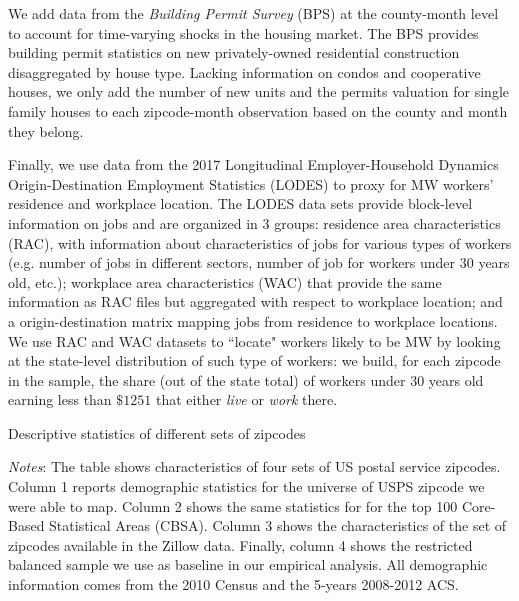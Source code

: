 We add data from the \textit{Building Permit Survey} (BPS) at the county-month level to account for 
time-varying shocks in the housing market. The BPS provides building permit statistics on new 
privately-owned residential construction disaggregated by house type. Lacking information on condos 
and cooperative houses, we only add the number of new units and the permits valuation for single 
family houses to each zipcode-month observation based on the county and month they belong. 

Finally, we use data from the 2017 Longitudinal Employer-Household Dynamics Origin-Destination 
Employment Statistics (LODES) to proxy for MW workers' residence and workplace location. The LODES 
data sets provide block-level information on jobs and are organized in 3 groups: residence area 
characteristics (RAC), with information about characteristics of jobs for various types of workers 
(e.g. number of jobs in different sectors, number of job for workers under 30 years old, etc.); 
workplace area characteristics (WAC) that provide the same information as RAC files but aggregated 
with respect to workplace location; and a origin-destination matrix mapping jobs from residence to 
workplace locations. We use RAC and WAC datasets to ``locate" workers likely to be MW by looking at 
the state-level distribution of such type of workers: we build, for each zipcode in the sample, the 
share (out of the state total) of workers under 30 years old earning less than $\$1251$ that either 
\textit{live} or \textit{work} there. 


\begin{table}[h!]
	\caption{Descriptive statistics of different sets of zipcodes}
	\centering
	\label{tab:desc_stats}    
	
	\begin{minipage}{0.95\textwidth} \footnotesize
		\vspace{3mm} 
		\textit{Notes}: The table shows characteristics of four sets of US postal service zipcodes.
		Column 1 reports demographic statistics for the universe of USPS zipcode we were able to 
		map. Column 2 shows the same statistics for for the top 100 Core-Based Statistical Areas 
		(CBSA). Column 3 shows the characteristics of the set of zipcodes available in the Zillow 
		data. Finally, column 4 shows the restricted balanced sample we use as baseline in our 
		empirical analysis. All demographic information comes from the 2010 Census and the 5-years 
		2008-2012 ACS.
	\end{minipage}
\end{table}


